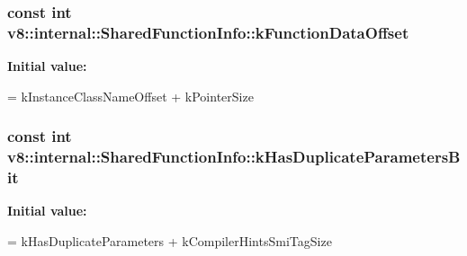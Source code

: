 \subsubsection[{\texorpdfstring{k\+Function\+Data\+Offset}{kFunctionDataOffset}}]{\setlength{\rightskip}{0pt plus 5cm}const int v8\+::internal\+::\+Shared\+Function\+Info\+::k\+Function\+Data\+Offset\hspace{0.3cm}{\ttfamily [static]}}\hypertarget{classv8_1_1internal_1_1_shared_function_info_aca3c804b0ee9fb8a7aa9de2f239aedc7}{}\label{classv8_1_1internal_1_1_shared_function_info_aca3c804b0ee9fb8a7aa9de2f239aedc7}
{\bfseries Initial value\+:}
\begin{DoxyCode}
=
      kInstanceClassNameOffset + kPointerSize
\end{DoxyCode}
\subsubsection[{\texorpdfstring{k\+Has\+Duplicate\+Parameters\+Bit}{kHasDuplicateParametersBit}}]{\setlength{\rightskip}{0pt plus 5cm}const int v8\+::internal\+::\+Shared\+Function\+Info\+::k\+Has\+Duplicate\+Parameters\+Bit\hspace{0.3cm}{\ttfamily [static]}}\hypertarget{classv8_1_1internal_1_1_shared_function_info_aa25f2d48a842cf06aa27f8574f35ab7b}{}\label{classv8_1_1internal_1_1_shared_function_info_aa25f2d48a842cf06aa27f8574f35ab7b}
{\bfseries Initial value\+:}
\begin{DoxyCode}
=
      kHasDuplicateParameters + kCompilerHintsSmiTagSize
\end{DoxyCode}
